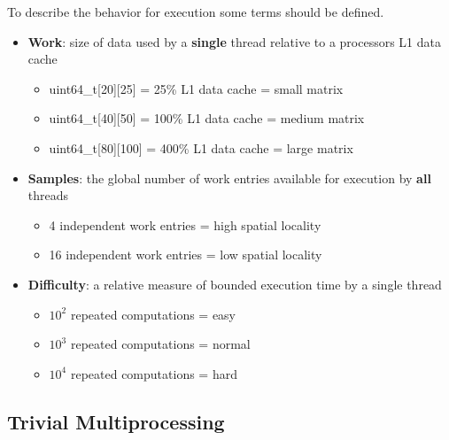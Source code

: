 \documentclass[11pt]{article}
\begin{document}
To describe the behavior for execution some terms should be defined.
\begin{itemize}
	\item \textbf{Work}: size of data used by a \textbf{single} thread relative to a processors L1 data cache
	\begin{itemize}
		\item uint64\_t[20][25] 	= 25\% L1 data cache	= small matrix
		\item uint64\_t[40][50] 	= 100\% L1 data cache	= medium matrix
		\item uint64\_t[80][100] 	= 400\% L1 data cache	= large matrix
	\end{itemize}
	\item \textbf{Samples}: the global number of work entries available for execution by \textbf{all} threads
	\begin{itemize}
		\item 4 independent work entries 	= high spatial locality
		\item 16 independent work entries 	= low spatial locality
	\end{itemize}
	\item \textbf{Difficulty}: a relative measure of bounded execution time by a single thread
	\begin{itemize}
		\item $10^2$ repeated computations = easy
		\item $10^3$ repeated computations = normal
		\item $10^4$ repeated computations = hard
	\end{itemize}
\end{itemize}

\subsection{Trivial Multiprocessing}
\end{document}
